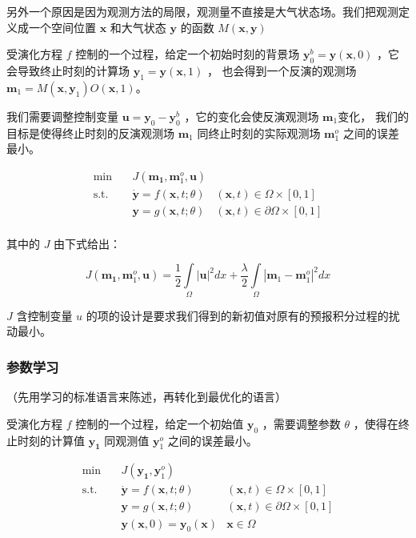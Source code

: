 \documentclass[a4paper,12pt]{article}
\begin{document}
另外一个原因是因为观测方法的局限，观测量不直接是大气状态场。我们把观测定义成一个空间位置 $ \mathbf{x} $ 和大气状态 $ \mathbf{y} $ 的函数 $ M(\mathbf{x}, \mathbf{y}) $

受演化方程 $ f $ 控制的一个过程，给定一个初始时刻的背景场 $ \mathbf{y}_0^b = \mathbf{y}(\mathbf{x}, 0) $ ，它会导致终止时刻的计算场 $ \mathbf{y}_1 = \mathbf{y}(\mathbf{x}, 1) $ ，
也会得到一个反演的观测场 $ \mathbf{m}_1 = M(\mathbf{x}, \mathbf{y}_1) O(\mathbf{x}, 1) $。

我们需要调整控制变量 $ \mathbf{u} = \mathbf{y}_0 - \mathbf{y}_0^b $ ，它的变化会使反演观测场 $ \mathbf{m}_1 $变化，
我们的目标是使得终止时刻的反演观测场 $ \mathbf{m}_1 $ 同终止时刻的实际观测场 $ \mathbf{m}_1^o $ 之间的误差最小。

$$
\begin{array}{rcll}
\min &~& J(\mathbf{m_1}, \mathbf{m}_1^o, \mathbf{u}) & \\
\mathrm{s.t.} &~& \dot{\mathbf{y}} = f(\mathbf{x}, t; \theta) & (\mathbf{x}, t) \in \Omega \times [0, 1] \\
&~& \mathbf{y} = g(\mathbf{x}, t; \theta) & (\mathbf{x}, t) \in \partial \Omega \times [0, 1] \\
\end{array}
$$

其中的 $ J $ 由下式给出：

$$
J(\mathbf{m_1}, \mathbf{m}_1^o, \mathbf{u}) = \frac{1}{2} \int\limits_{\Omega}|\mathbf{u}|^2 dx + \frac{\lambda}{2} \int\limits_{\Omega}|\mathbf{m}_1 - \mathbf{m}_1^o|^2 dx
$$

$ J $ 含控制变量 $ u $ 的项的设计是要求我们得到的新初值对原有的预报积分过程的扰动最小。

\subsubsection{参数学习}

（先用学习的标准语言来陈述，再转化到最优化的语言）

受演化方程 $ f $ 控制的一个过程，给定一个初始值 $ \mathbf{y}_0 $ ，需要调整参数 $ \theta $ ，使得在终止时刻的计算值 $ \mathbf{y_1} $ 同观测值 $ \mathbf{y}_1^o $ 之间的误差最小。

$$
\begin{array}{rcll}
\min &~& J(\mathbf{y_1}, \mathbf{y}_1^o) & \\
\mathrm{s.t.} &~& \dot{\mathbf{y}} = f(\mathbf{x}, t; \theta) & (\mathbf{x}, t) \in \Omega \times [0, 1] \\
&~& \mathbf{y} = g(\mathbf{x}, t; \theta) & (\mathbf{x}, t) \in \partial \Omega \times [0, 1] \\
&~& \mathbf{y}(\mathbf{x}, 0) = \mathbf{y}_0(\mathbf{x}) & \mathbf{x} \in \Omega
\end{array}
$$
\end{document}
